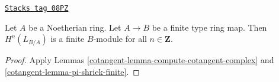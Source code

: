 \begin{lemma}
\label{cotangent-lemma-cotangent-finite}
\href{https://stacks.math.columbia.edu/tag/08PZ}{\texttt{Stacks tag 08PZ}}

Let $A$ be a Noetherian ring. Let $A \to B$ be a finite type ring map.
Then $H^n(L_{B/A})$ is a finite $B$-module for all $n \in \mathbf{Z}$.
\end{lemma}

\begin{proof}

Apply Lemmas \ref{cotangent-lemma-compute-cotangent-complex} and
\ref{cotangent-lemma-pi-shriek-finite}.
\end{proof}

